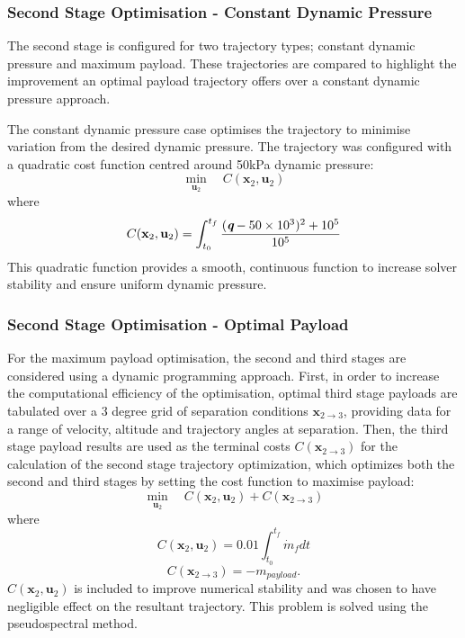 \documentclass[]{aiaa-tc}
\begin{document}
	  
	  
	 
	 
	 	 \subsubsection{Second Stage Optimisation - Constant Dynamic Pressure}
	 	 The second stage is configured for two trajectory types; constant dynamic pressure and maximum payload. These trajectories are compared to highlight the improvement an optimal payload trajectory offers over a constant dynamic pressure approach. 
	 	 
	 	 The constant dynamic pressure case optimises the trajectory to minimise variation from the desired dynamic pressure.
	 	 The trajectory was configured with a quadratic cost function centred around 50kPa dynamic pressure:
	 	 \begin{equation} 
	 	 \min\limits_{\textbf{u}_2} \quad C(\textbf{x}_{2},\textbf{u}_{2}) 
	 	 \end{equation}
	 	 where
	 	 \begin{equation}
	 	 C(\textbf{x}_{2},\textbf{u}_{2}) = \int_{t_0}^{t_f} \frac{(\textit{\textbf{q}}-50\times 10^3)^2+10^5}{10^5} 
	 	 \end{equation}
	This quadratic function provides a smooth, continuous function to increase solver stability and ensure uniform dynamic pressure. 
	 	 
	 	 \subsubsection{Second Stage Optimisation - Optimal Payload}
	 For the maximum payload optimisation, the second and third stages are considered using a dynamic programming approach. First, in order to increase the computational efficiency of the optimisation, optimal third stage payloads are tabulated  over a 3 degree grid of separation conditions $\textbf{x}_{2 \rightarrow 3}$, providing data for a range of velocity, altitude and trajectory angles at separation. Then, the third stage payload results are used as the terminal costs $C(\textbf{x}_{2 \rightarrow 3})$ for the calculation of the second stage trajectory optimization, which optimizes both the second and third stages by setting the cost function to maximise payload:
	  \begin{equation}
	  \min\limits_{\textbf{u}_2} \quad C(\textbf{x}_{2},\textbf{u}_{2}) + C(\textbf{x}_{2 \rightarrow 3})
	  \end{equation}
	  where
	  \begin{equation}
	  C(\textbf{x}_{2},\textbf{u}_{2}) = 0.01\int_{t_0}^{t_f}\dot{m}_{f} dt
	  \end{equation}
	  \begin{equation}
	  C(\textbf{x}_{2 \rightarrow 3}) = -m_{payload}.
	  \end{equation}
	   $C(\textbf{x}_{2},\textbf{u}_{2})$ is included to improve numerical stability and was chosen to have negligible effect on the resultant trajectory.
	 This problem is solved using the pseudospectral method.
	 
\end{document}
